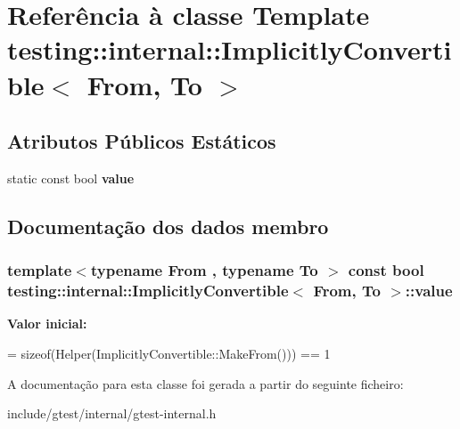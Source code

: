 \hypertarget{classtesting_1_1internal_1_1ImplicitlyConvertible}{\section{Referência à classe Template testing\-:\-:internal\-:\-:Implicitly\-Convertible$<$ From, To $>$}
\label{classtesting_1_1internal_1_1ImplicitlyConvertible}
}
\subsection*{Atributos Públicos Estáticos}
\begin{DoxyCompactItemize}
\item 
static const bool {\bfseries value}
\end{DoxyCompactItemize}


\subsection{Documentação dos dados membro}
\hypertarget{classtesting_1_1internal_1_1ImplicitlyConvertible_aea51cecabca681fb75659e224771b7b7}{
\subsubsection[{value}]{\setlength{\rightskip}{0pt plus 5cm}template$<$typename From , typename To $>$ const bool {\bf testing\-::internal\-::\-Implicitly\-Convertible}$<$ From, To $>$\-::value\hspace{0.3cm}{\ttfamily [static]}}}\label{classtesting_1_1internal_1_1ImplicitlyConvertible_aea51cecabca681fb75659e224771b7b7}
{\bfseries Valor inicial\-:}
\begin{DoxyCode}
=
      \textcolor{keyword}{sizeof}(Helper(ImplicitlyConvertible::MakeFrom())) == 1
\end{DoxyCode}


A documentação para esta classe foi gerada a partir do seguinte ficheiro\-:\begin{DoxyCompactItemize}
\item 
include/gtest/internal/gtest-\/internal.\-h\end{DoxyCompactItemize}
